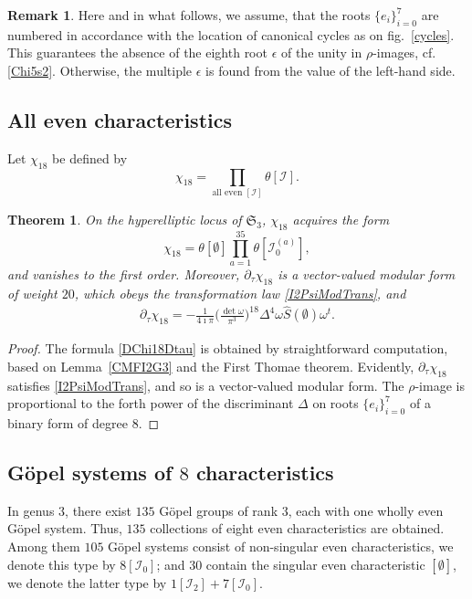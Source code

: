 \documentclass[twoside]{amsart}
\newcommand{\I}{\mathcal{I}}
\newtheorem{theo}{Theorem}[section]
\theoremstyle{definition}
\newtheorem{rem}{Remark}[section]
\theoremstyle{plain}
\begin{document}
\begin{rem}
Here and in what follows, we assume, that 
the roots $\{e_i\}_{i=0}^7$ are numbered in accordance with the location of
canonical cycles as on  fig.~\ref{cycles}. This guarantees the absence of the eighth root $\epsilon$ of the unity
in $\rho$-images, cf.\,\eqref{Chi5s2}. Otherwise, the multiple $\epsilon$ is found from the value of the left-hand side.
\end{rem}


\subsection{All even characteristics}
Let $\chi_{18}$ be defined by
\begin{equation}\label{Chi18Gen}
\chi_{18} = \prod_{\text{all even }[\I]} \theta[\I].
\end{equation}

\begin{theo}
On the hyperelliptic locus of $\mathfrak{S}_3$, $\chi_{18}$ acquires the form
\begin{equation}\label{Chi18}
\chi_{18} = \theta[\emptyset] \prod_{a=1}^{35} \theta[\I_0^{(a)}],
\end{equation}
and vanishes to the first order. Moreover, $\partial_{\tau} \chi_{18}$
is a vector-valued modular form of weight $20$, which obeys the transformation law \eqref{I2PsiModTrans},
and
\begin{gather}\label{DChi18Dtau}
\partial_{\tau} \chi_{18} = - \frac{1}{4\imath \pi}  \Big(\frac{\det \omega}{\pi^3}\Big)^{18}
 \Delta^4 \omega \hat{S}(\emptyset) \omega^t.
\end{gather}
\end{theo}
\begin{proof}
The formula \eqref{DChi18Dtau} is obtained by straightforward computation, based on
Lemma~\ref{CMFI2G3} and the First Thomae theorem. Evidently,
$\partial_{\tau} \chi_{18}$ satisfies \eqref{I2PsiModTrans}, and so is a vector-valued modular form.
The $\rho$-image is proportional to the forth power of the discriminant $\Delta$ 
on roots $\{e_i\}_{i=0}^7$ of a binary form of degree $8$.
\end{proof}


\subsection{G\"{o}pel systems of $8$ characteristics}
In genus $3$, there exist  $135$ G\"{o}pel groups of rank $3$, 
each with one wholly even G\"{o}pel system. 
Thus, $135$ collections of eight even characteristics are obtained. 
Among them $105$ G\"{o}pel systems consist of non-singular even characteristics, 
we denote this type by $8[\I_0]$; and 
$30$ contain the singular even characteristic $[\emptyset]$, 
we denote the latter type by $1[\I_2]+7[\I_0]$.
\end{document}
